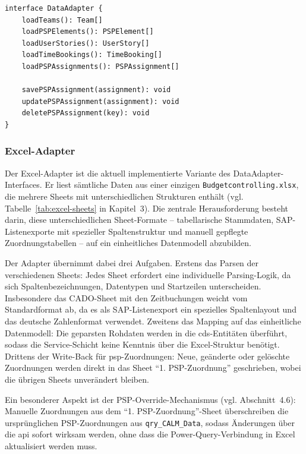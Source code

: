 \begin{lstlisting}[caption={Adapter-Interface (konzeptionell)}, label={lst:adapter-interface}]
interface DataAdapter {
    loadTeams(): Team[]
    loadPSPElements(): PSPElement[]
    loadUserStories(): UserStory[]
    loadTimeBookings(): TimeBooking[]
    loadPSPAssignments(): PSPAssignment[]

    savePSPAssignment(assignment): void
    updatePSPAssignment(assignment): void
    deletePSPAssignment(key): void
}
\end{lstlisting}

\subsubsection{Excel-Adapter}

Der Excel-Adapter ist die aktuell implementierte Variante des DataAdapter-Interfaces. Er liest sämtliche Daten aus einer einzigen \texttt{Budgetcontrolling.xlsx}, die mehrere Sheets mit unterschiedlichen Strukturen enthält (vgl. Tabelle~\ref{tab:excel-sheets} in Kapitel~3). Die zentrale Herausforderung besteht darin, diese unterschiedlichen Sheet-Formate -- tabellarische Stammdaten, SAP-Listenexporte mit spezieller Spaltenstruktur und manuell gepflegte Zuordnungstabellen -- auf ein einheitliches Datenmodell abzubilden.

Der Adapter übernimmt dabei drei Aufgaben. Erstens das Parsen der verschiedenen Sheets: Jedes Sheet erfordert eine individuelle Parsing-Logik, da sich Spaltenbezeichnungen, Datentypen und Startzeilen unterscheiden. Insbesondere das CADO-Sheet mit den Zeitbuchungen weicht vom Standardformat ab, da es als SAP-Listenexport ein spezielles Spaltenlayout und das deutsche Zahlenformat verwendet. Zweitens das Mapping auf das einheitliche Datenmodell: Die geparsten Rohdaten werden in die \gls{cds}-Entitäten überführt, sodass die Service-Schicht keine Kenntnis über die Excel-Struktur benötigt. Drittens der Write-Back für \gls{psp}-Zuordnungen: Neue, geänderte oder gelöschte Zuordnungen werden direkt in das Sheet \enquote{1. PSP-Zuordnung} geschrieben, wobei die übrigen Sheets unverändert bleiben.

Ein besonderer Aspekt ist der PSP-Override-Mechanismus (vgl. Abschnitt~4.6): Manuelle Zuordnungen aus dem \enquote{1. PSP-Zuordnung}-Sheet überschreiben die ursprünglichen PSP-Zuordnungen aus \texttt{qry\_CALM\_Data}, sodass Änderungen über die \gls{api} sofort wirksam werden, ohne dass die Power-Query-Verbindung in Excel aktualisiert werden muss.

